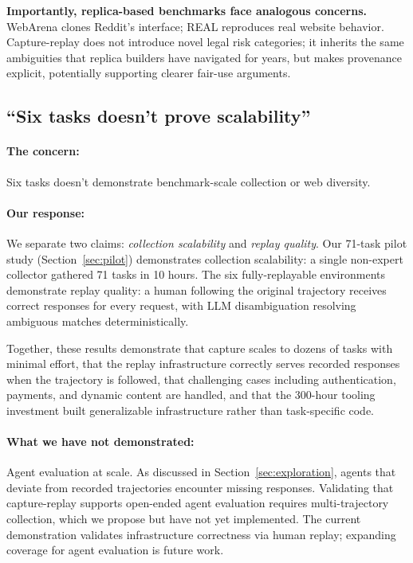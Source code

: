 \documentclass[letterpaper]{article}
\begin{document}
\textbf{Importantly, replica-based benchmarks face analogous concerns.} WebArena clones Reddit's interface; REAL reproduces real website behavior. Capture-replay does not introduce novel legal risk categories; it inherits the same ambiguities that replica builders have navigated for years, but makes provenance explicit, potentially supporting clearer fair-use arguments.

\subsection{``Six tasks doesn't prove scalability''}

\paragraph{The concern:} Six tasks doesn't demonstrate benchmark-scale collection or web diversity.

\paragraph{Our response:} We separate two claims: \emph{collection scalability} and \emph{replay quality}. Our 71-task pilot study (Section~\ref{sec:pilot}) demonstrates collection scalability: a single non-expert collector gathered 71 tasks in 10 hours. The six fully-replayable environments demonstrate replay quality: a human following the original trajectory receives correct responses for every request, with LLM disambiguation resolving ambiguous matches deterministically.

Together, these results demonstrate that capture scales to dozens of tasks with minimal effort, that the replay infrastructure correctly serves recorded responses when the trajectory is followed, that challenging cases including authentication, payments, and dynamic content are handled, and that the 300-hour tooling investment built generalizable infrastructure rather than task-specific code.

\paragraph{What we have not demonstrated:} Agent evaluation at scale. As discussed in Section~\ref{sec:exploration}, agents that deviate from recorded trajectories encounter missing responses. Validating that capture-replay supports open-ended agent evaluation requires multi-trajectory collection, which we propose but have not yet implemented. The current demonstration validates infrastructure correctness via human replay; expanding coverage for agent evaluation is future work.
\end{document}
